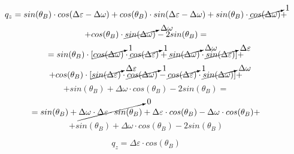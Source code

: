 \documentclass[10pt]{article}         %
\begin{document}
$$
	q_z =   sin(\theta_B) \cdot cos( \Delta \varepsilon  -  \Delta \omega )+
	cos(\theta_B) \cdot sin( \Delta \varepsilon  -  \Delta \omega )+
	sin(\theta_B) \cdot \cancelto{1}{cos(\Delta \omega)}  +
$$
$$
	+cos(\theta_B) \cdot\cancelto{\Delta \omega}{sin(\Delta \omega)} - 2sin(\theta_B) = 
$$
$$
	=  sin(\theta_B) \cdot [\cancelto{1}{cos(\Delta \omega)} \cdot \cancelto{1}{cos(\Delta \varepsilon)} +\cancelto{\Delta \omega}{sin(\Delta \omega)} \cdot \cancelto{\Delta \varepsilon}{sin(\Delta \varepsilon)}
	]+
$$
$$
	+cos(\theta_B) \cdot [\cancelto{\Delta \varepsilon}{sin(\Delta \varepsilon)} \cdot
	 \cancelto{1}{cos(\Delta \omega)} - \cancelto{1}{cos(\Delta \varepsilon)}  \cdot
	 \cancelto{\Delta \omega}{sin(\Delta \omega)}
	 ]+
$$
$$
	+sin(\theta_B) + \Delta \omega \cdot cos(\theta_B)  - 2sin(\theta_B) =
$$
$$
	= sin(\theta_B) +\cancelto{0}{  \Delta \omega \cdot \Delta \varepsilon \cdot sin(\theta_B)} +			\Delta \varepsilon  \cdot  cos(\theta_B)  - \Delta \omega  \cdot  cos(\theta_B) +
$$
$$
	+sin(\theta_B) + \Delta \omega  \cdot  cos(\theta_B)  - 2sin(\theta_B)
$$

\begin{equation}
	q_z = \Delta \varepsilon  \cdot  cos(\theta_B)
\end{equation}
\end{document}
